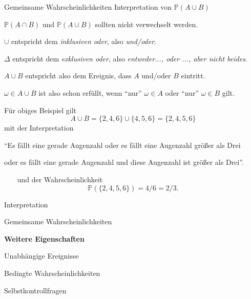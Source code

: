 \documentclass[
  8pt,
  ignorenonframetext,
]{beamer}
\begin{document}
\begin{frame}{Gemeinsame Wahrscheinlichkeiten}
\protect\hypertarget{gemeinsame-wahrscheinlichkeiten-2}{}
Interpretation von \(\mathbb{P}(A \cup B)\) \small

\begin{itemize}
\begin{small}
\item $\mathbb{P}(A \cap B)$ und $\mathbb{P}(A \cup B)$ sollten nicht verwechselt werden.
\item $\cup$ entspricht dem \textit{inklusiven oder}, also \textit{und/oder}.
\item $\Delta$ entspricht dem \textit{exklusiven oder}, also \textit{entweder..., oder ..., aber nicht beides}.
\item $A \cup B$ entspricht also dem Ereignis, dass $A$ und/oder $B$ eintritt.
\item $\omega \in A \cup B$ ist also schon erfüllt, wenn ``nur'' $\omega \in A$ oder ``nur'' $\omega \in B$ gilt.
\item Für obiges Beispiel gilt
\begin{equation}
A \cup B = \{2,4,6\} \cup \{4,5,6\} = \{2,4,5,6\}
\end{equation}
mit der Interpretation
\end{small}
\end{itemize}

\center

``Es fällt eine gerade Augenzahl oder es fällt eine Augenzahl größer als
Drei

oder es fällt eine gerade Augenzahl und diese Augenzahl ist größer als
Drei''.

\justifying

\(\quad\,\,\,\) und der Wahrscheinlichkeit \begin{equation}
\mathbb{P}(\{2,4,5,6\}) = 4/6 = 2/3.
\end{equation}
\end{frame}

\begin{frame}{}
\protect\hypertarget{section-7}{}
\vfill
\large

Interpretation

Gemeinsame Wahrscheinlichkeiten

\textbf{Weitere Eigenschaften}

Unabhängige Ereignisse

Bedingte Wahrscheinlichkeiten

Selbstkontrollfragen \vfill
\end{frame}
\end{document}
